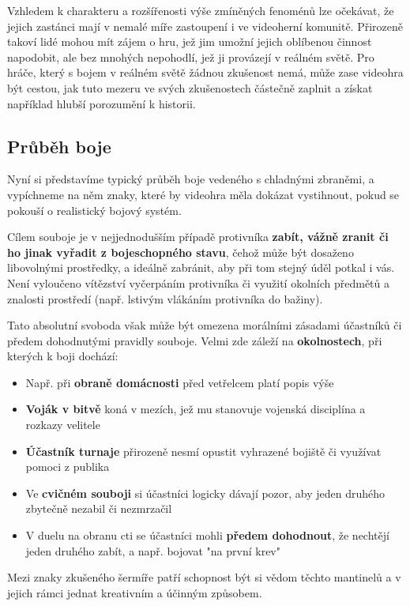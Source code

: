 Vzhledem k charakteru a rozšířenosti výše zmíněných fenoménů lze očekávat, že jejich zastánci mají v nemalé míře zastoupení i ve videoherní komunitě. Přirozeně takoví lidé mohou mít zájem o hru, jež jim umožní jejich oblíbenou činnost napodobit, ale bez mnohých nepohodlí, jež ji provázejí v reálném světě. Pro hráče, který s bojem v reálném světě žádnou zkušenost nemá, může zase videohra být cestou, jak tuto mezeru ve svých zkušenostech částečně zaplnit a získat například hlubší porozumění k historii.

\subsection{Průběh boje}
Nyní si představíme typický průběh boje vedeného s chladnými zbraněmi, a vypíchneme na něm znaky, které by videohra měla dokázat vystihnout, pokud se pokouší o realistický bojový systém.
\bigbreak

Cílem souboje je v nejjednodušším případě protivníka \textbf{zabít, vážně zranit či ho jinak vyřadit z bojeschopného stavu}, čehož může být dosaženo libovolnými prostředky, a ideálně zabránit, aby při tom stejný úděl potkal i vás. Není vyloučeno vítězství vyčerpáním protivníka či využití okolních předmětů a znalosti prostředí (např. lstivým vlákáním protivníka do bažiny).

Tato absolutní svoboda však může být omezena morálními zásadami účastníků\cite{HistoryOfSurrender} či předem dohodnutými pravidly souboje. Velmi zde záleží na \textbf{okolnostech}, při kterých k boji dochází:
\begin{itemize}
    \item Např. při \textbf{obraně domácnosti} před vetřelcem platí popis výše
    \item \textbf{Voják v bitvě} koná v mezích, jež mu stanovuje vojenská disciplína a rozkazy velitele
    \item \textbf{Účastník turnaje} přirozeně nesmí opustit vyhrazené bojiště či využívat pomoci z publika
    \item Ve \textbf{cvičném souboji} si účastníci logicky dávají pozor, aby jeden druhého zbytečně nezabil či nezmrzačil
    \item V duelu na obranu cti se účastníci mohli \textbf{předem dohodnout}, že nechtějí jeden druhého zabít, a např. bojovat "na první krev"
\end{itemize}
Mezi znaky zkušeného šermíře patří schopnost být si vědom těchto mantinelů a v jejich rámci jednat kreativním a účinným způsobem.


